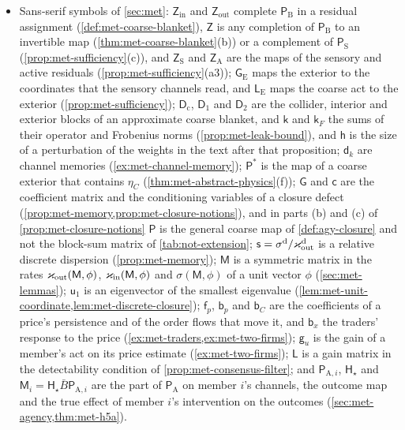 \begin{itemize}
\item Sans-serif symbols of \cref{sec:met}: $\mathsf Z_{\mathrm{in}}$ and $\mathsf Z_{\mathrm{out}}$ complete $\mathsf P_{\mathrm B}$ in a residual assignment (\cref{def:met-coarse-blanket}), $\mathsf Z$ is any completion of $\mathsf P_{\mathrm B}$ to an invertible map (\cref{thm:met-coarse-blanket}(b)) or a complement of $\mathsf P_{\mathrm S}$ (\cref{prop:met-sufficiency}(c)), and $\mathsf Z_{\mathrm S}$ and $\mathsf Z_{\mathrm A}$ are the maps of the sensory and active residuals (\cref{prop:met-sufficiency}(a3)); $\mathsf G_{\mathrm E}$ maps the exterior to the coordinates that the sensory channels read, and $\mathsf L_{\mathrm E}$ maps the coarse act to the exterior (\cref{prop:met-sufficiency}); $\mathsf D_{\mathrm c}$, $\mathsf D_1$ and $\mathsf D_2$ are the collider, interior and exterior blocks of an approximate coarse blanket, and $\mathsf k$ and $\mathsf k_F$ the sums of their operator and Frobenius norms (\cref{prop:met-leak-bound}), and $\mathsf h$ is the size of a perturbation of the weights in the text after that proposition; $\mathsf d_k$ are channel memories (\cref{ex:met-channel-memory}); $\mathsf P^\ast$ is the map of a coarse exterior that contains $\eta_C$ (\cref{thm:met-abstract-physics}(f)); $\mathsf G$ and $\mathsf c$ are the coefficient matrix and the conditioning variables of a closure defect (\cref{prop:met-memory,prop:met-closure-notions}), and in parts (b) and (c) of \cref{prop:met-closure-notions} $\mathsf P$ is the general coarse map of \cref{def:agy-closure} and not the block-sum matrix of \cref{tab:not-extension}; $\mathsf s=\sigma^{\mathrm d}/\varkappa_{\mathrm{out}}^{\mathrm d}$ is a relative discrete dispersion (\cref{prop:met-memory}); $\mathsf M$ is a symmetric matrix in the rates $\varkappa_{\mathrm{out}}(\mathsf M,\phi)$, $\varkappa_{\mathrm{in}}(\mathsf M,\phi)$ and $\sigma(\mathsf M,\phi)$ of a unit vector $\phi$ (\cref{sec:met-lemmas}); $\mathsf u_1$ is an eigenvector of the smallest eigenvalue (\cref{lem:met-unit-coordinate,lem:met-discrete-closure}); $\mathsf f_p$, $\mathsf b_p$ and $\mathsf b_C$ are the coefficients of a price's persistence and of the order flows that move it, and $\mathsf b_x$ the traders' response to the price (\cref{ex:met-traders,ex:met-two-firms}); $\mathsf g_u$ is the gain of a member's act on its price estimate (\cref{ex:met-two-firms}); $\mathsf L$ is a gain matrix in the detectability condition of \cref{prop:met-consensus-filter}; and $\mathsf P_{\mathrm A,i}$, $\mathsf H_\star$ and $\mathsf M_i=\mathsf H_\star\bar B\mathsf P_{\mathrm A,i}$ are the part of $\mathsf P_{\mathrm A}$ on member $i$'s channels, the outcome map and the true effect of member $i$'s intervention on the outcomes (\cref{sec:met-agency,thm:met-h5a}).

\end{itemize}
